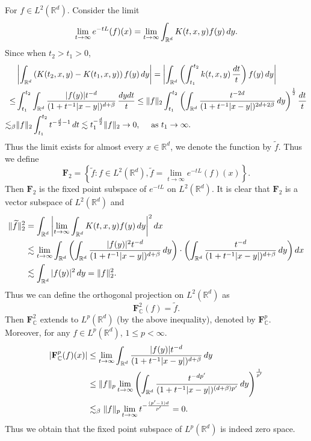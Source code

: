 \documentclass[oneside,english,a4wide]{amsart}
\numberwithin{equation}{section}
\numberwithin{figure}{section}
\theoremstyle{plain}
\theoremstyle{plain}
\theoremstyle{definition}
\theoremstyle{plain}
\theoremstyle{remark}
\theoremstyle{definition}
\theoremstyle{remark}
\theoremstyle{definition}
\newcommand{\real}{{\mathbb R}}
\newcommand{\com}{{\mathbb C}}
\newcommand{\8}{+\infty}
\renewcommand{\1}{\mathbbm{1}}
\newcommand{\wt}{\widetilde}
\newcommand\jdz[1]{ \left| #1 \right| }
\newcommand\sk[1]{ \left( #1 \right) }
\newcommand\lk[1]{ \left\{ #1 \right\} }
\renewcommand\d{{\rm d}}
\begin{document}
{{For $f \in L^2(\real^d)$. Consider the limit
\[
    \lim_{t \to \infty} e^{-tL}(f)(x) = \lim_{t\to \infty} \int_{\real^d} K(t, x, y)f(y)\,\d y.
\]
Since when $t_2 > t_1 > 0$,
\[
\begin{aligned}
    & \jdz{ \int_{\real^d} \sk{ K(t_2, x, y) - K(t_1, x, y) }f(y)\,\d y } = \jdz{ \int_{\real^d} \sk{ \int_{t_1}^{t_2}k(t, x, y)\,\frac{\d t}{t} }f(y)\,\d y } \\
    \leq & \int_{t_1}^{t_2}\int_{\real^d} \frac{|f(y)|t^{-d}}{(1 + t^{-1}|x - y|)^{d+\beta}} \,\frac{\d y\d t}{t}
    \leq \| f \|_2 \int_{t_1}^{t_2}\sk{ \int_{\real^d} \frac{t^{-2d}}{(1 + t^{-1}|x - y|)^{2d+2\beta}} \,\d y }^{\frac{1}{2}}\frac{\d t}{t} \\
    \lesssim_\beta & \| f \|_2\int_{t_1}^{t_2} t^{-\frac{d}{2}-1}\,\d t \lesssim t_1^{-\frac{d}{2}}\| f \|_2 \to 0,\quad \text{ as } t_1 \to \infty.
\end{aligned}
\]
Thus the limit exists for almost every $x \in \real^d$, we denote the function by $\wt{f}$. Thus we define
\[
    \mathbf{F}_2 = \lk{ \wt{f}: f \in L^2(\real^d), \wt{f} = \lim_{t \to \infty} e^{-tL}(f)(x) }.
\]
Then $\mathbf{F}_2$ is the fixed point subspace of $e^{-tL}$ on $L^2(\real^d)$. It is clear that $\mathbf{F}_2$ is a vector subspace of $L^2(\real^d)$ and
\[
\begin{aligned}
    \| \wt{f} \|_2^2 & = \int_{\real^d }\jdz{ \lim_{t \to \infty} \int_{\real^d} K(t, x, y)f(y)\,\d y}^2 \d x \\
    & \lesssim \lim_{t \to \infty}\int_{\real^d}\sk{ \int_{\real^d} \frac{|f(y)|^2t^{-d}}{(1 + t^{-1}|x - y|)^{d + \beta}} \,\d y } \cdot \sk{ \int_{\real^d} \frac{t^{-d}}{(1 + t^{-1}|x - y|)^{d + \beta}} \,\d y } \d x \\
    & \lesssim \int_{\real^d} |f(y)|^2 \,\d y = \| f \|_2^2.
\end{aligned}
\]
Thus we can define the orthogonal projection on $L^2(\real^d)$ as
\[
    \mathbf{F}^2_\com (f) = \wt{f}. 
\]
Then $\mathbf{F}^2_\com$ extends to $L^p(\real^d)$ (by the above inequality), denoted by $\mathbf{F}^p_\com$. Moreover, for any $f \in L^p(\real^d)$, $1 \leq p < \infty$.
\[
\begin{aligned}
    |\mathbf{F}^p_\com(f)(x)| & \leq \lim_{t \to \infty}  \int_{\real^d} \frac{|f(y)|t^{-d}}{(1 + t^{-1}|x-y|)^{d+\beta}}\,\d y \\
    & \leq \| f \|_p \lim_{t \to \infty}  \sk{ \int_{\real^d} \frac{t^{-dp'}}{(1 + t^{-1}|x-y|)^{(d+\beta)p'}}\,\d y }^{\frac{1}{p'}} \\
    & \lesssim_\beta \| f \|_p \lim_{t \to \infty} t^{-\frac{(p'-1)d}{p'}}  = 0.
\end{aligned} 
\]
Thus we obtain that the fixed point subspace of $L^p(\real^d)$ is indeed zero space.
}
\fi






}
\end{document}
